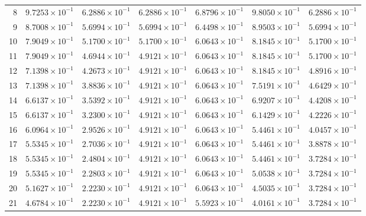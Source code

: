 \begin{table}[H]
\begin{tabular}{@{}rrrrrrr@{}}
8 & $9.7253\times10^{-1}$ & $6.2886\times10^{-1}$ & $6.2886\times10^{-1}$ & $6.8796\times10^{-1}$ & $9.8050\times10^{-1}$ & $6.2886\times10^{-1}$\\
9 & $8.7008\times10^{-1}$ & $5.6994\times10^{-1}$ & $5.6994\times10^{-1}$ & $6.4498\times10^{-1}$ & $8.9503\times10^{-1}$ & $5.6994\times10^{-1}$\\
10 & $7.9049\times10^{-1}$ & $5.1700\times10^{-1}$ & $5.1700\times10^{-1}$ & $6.0643\times10^{-1}$ & $8.1845\times10^{-1}$ & $5.1700\times10^{-1}$\\
11 & $7.9049\times10^{-1}$ & $4.6944\times10^{-1}$ & $4.9121\times10^{-1}$ & $6.0643\times10^{-1}$ & $8.1845\times10^{-1}$ & $5.1700\times10^{-1}$\\
12 & $7.1398\times10^{-1}$ & $4.2673\times10^{-1}$ & $4.9121\times10^{-1}$ & $6.0643\times10^{-1}$ & $8.1845\times10^{-1}$ & $4.8916\times10^{-1}$\\
13 & $7.1398\times10^{-1}$ & $3.8836\times10^{-1}$ & $4.9121\times10^{-1}$ & $6.0643\times10^{-1}$ & $7.5191\times10^{-1}$ & $4.6429\times10^{-1}$\\
14 & $6.6137\times10^{-1}$ & $3.5392\times10^{-1}$ & $4.9121\times10^{-1}$ & $6.0643\times10^{-1}$ & $6.9207\times10^{-1}$ & $4.4208\times10^{-1}$\\
15 & $6.6137\times10^{-1}$ & $3.2300\times10^{-1}$ & $4.9121\times10^{-1}$ & $6.0643\times10^{-1}$ & $6.1429\times10^{-1}$ & $4.2226\times10^{-1}$\\
16 & $6.0964\times10^{-1}$ & $2.9526\times10^{-1}$ & $4.9121\times10^{-1}$ & $6.0643\times10^{-1}$ & $5.4461\times10^{-1}$ & $4.0457\times10^{-1}$\\
17 & $5.5345\times10^{-1}$ & $2.7036\times10^{-1}$ & $4.9121\times10^{-1}$ & $6.0643\times10^{-1}$ & $5.4461\times10^{-1}$ & $3.8878\times10^{-1}$\\
18 & $5.5345\times10^{-1}$ & $2.4804\times10^{-1}$ & $4.9121\times10^{-1}$ & $6.0643\times10^{-1}$ & $5.4461\times10^{-1}$ & $3.7284\times10^{-1}$\\
19 & $5.5345\times10^{-1}$ & $2.2803\times10^{-1}$ & $4.9121\times10^{-1}$ & $6.0643\times10^{-1}$ & $5.0538\times10^{-1}$ & $3.7284\times10^{-1}$\\
20 & $5.1627\times10^{-1}$ & $2.2230\times10^{-1}$ & $4.9121\times10^{-1}$ & $6.0643\times10^{-1}$ & $4.5035\times10^{-1}$ & $3.7284\times10^{-1}$\\
21 & $4.6784\times10^{-1}$ & $2.2230\times10^{-1}$ & $4.9121\times10^{-1}$ & $5.5923\times10^{-1}$ & $4.0161\times10^{-1}$ & $3.7284\times10^{-1}$\\

\end{tabular}
\end{table}
